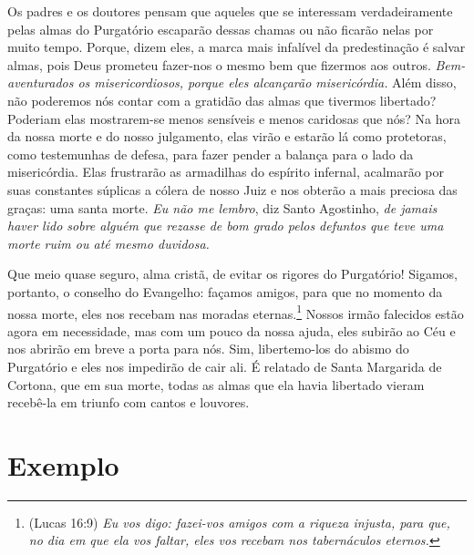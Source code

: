 Os padres e os doutores pensam que aqueles que se interessam verdadeiramente pelas almas do Purgatório escaparão dessas chamas ou não ficarão nelas por muito tempo. Porque, dizem eles, a marca mais infalível da predestinação é salvar almas, pois Deus prometeu fazer-nos o mesmo bem que fizermos aos outros. \textit{Bem-aventurados os misericordiosos, porque eles alcançarão misericórdia.} Além disso, não poderemos nós contar com a gratidão das almas que tivermos libertado? Poderiam elas mostrarem-se menos sensíveis e menos caridosas que nós? Na hora da nossa morte e do nosso julgamento, elas virão e estarão lá como protetoras, como testemunhas de defesa, para fazer pender a balança para o lado da misericórdia. Elas frustrarão as armadilhas do espírito infernal, acalmarão por suas constantes súplicas a cólera de nosso Juiz e nos obterão a mais preciosa das graças: uma santa morte. \textit{Eu não me lembro}, diz Santo Agostinho, \textit{de jamais haver lido sobre alguém que rezasse de bom grado pelos defuntos que teve uma morte ruim ou até mesmo duvidosa.}

Que meio quase seguro, alma cristã, de evitar os rigores do Purgatório! Sigamos, portanto, o conselho do Evangelho: façamos amigos, para que no momento da nossa morte, eles nos recebam nas moradas eternas.\footnote{(Lucas 16:9) \textit{Eu vos digo: fazei-vos amigos com a riqueza injusta, para que, no dia em que ela vos faltar, eles vos recebam nos tabernáculos eternos.}} Nossos irmão falecidos estão agora em necessidade, mas com um pouco da nossa ajuda, eles subirão ao Céu e nos abrirão em breve a porta para nós. Sim, libertemo-los do abismo do Purgatório e eles nos impedirão de cair ali. É relatado de Santa Margarida de Cortona, que em sua morte, todas as almas que ela havia libertado vieram recebê-la em triunfo com cantos e louvores.


\section*{Exemplo}

